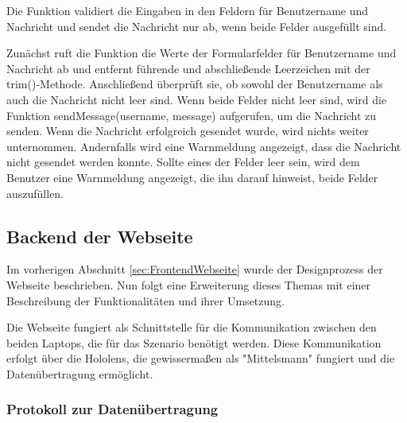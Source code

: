Die Funktion validiert die Eingaben in den Feldern für Benutzername und Nachricht und sendet die Nachricht nur ab, wenn
beide Felder ausgefüllt sind.

Zunächst ruft die Funktion die Werte der Formularfelder für Benutzername und Nachricht ab und entfernt führende und
abschließende Leerzeichen mit der trim()-Methode. Anschließend überprüft sie, ob sowohl der Benutzername als auch die
Nachricht nicht leer sind. Wenn beide Felder nicht leer sind, wird die Funktion sendMessage(username, message) aufgerufen,
um die Nachricht zu senden. Wenn die Nachricht erfolgreich gesendet wurde, wird nichts weiter unternommen. Andernfalls wird
eine Warnmeldung angezeigt, dass die Nachricht nicht gesendet werden konnte. Sollte eines der Felder leer sein, wird dem
Benutzer eine Warnmeldung angezeigt, die ihn darauf hinweist, beide Felder auszufüllen.


\subsection{Backend der Webseite} 

Im vorherigen Abschnitt \ref{sec:FrontendWebseite} wurde der Designprozess der Webseite beschrieben. Nun folgt eine
Erweiterung dieses Themas mit einer Beschreibung der Funktionalitäten und ihrer Umsetzung.

Die Webseite fungiert als Schnittstelle für die Kommunikation zwischen den beiden Laptops, die für das Szenario benötigt
werden. Diese Kommunikation erfolgt über die Hololens, die gewissermaßen als "Mittelsmann" fungiert und die Datenübertragung ermöglicht.
\subsubsection{Protokoll zur Datenübertragung}

